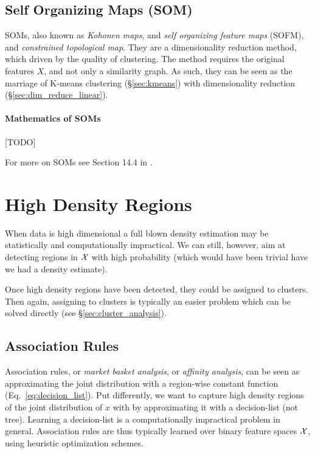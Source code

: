 \subsection{Self Organizing Maps (SOM)}
\label{sec:som}
SOMs, also known as \emph{Kohonen maps}, and \emph{self organizing feature maps} (SOFM), and \emph{constrained topological map}. 
They are a dimensionality reduction method, which driven by the quality of clustering.
The method requires the original features $X$, and not only a similarity graph. 
As such, they can be seen as the marriage of K-means clustering (\S\ref{sec:kmeans}) with dimensionality reduction (\S\ref{sec:dim_reduce_linear}).



\paragraph{Mathematics of SOMs}
[TODO]

For more on SOMs see Section 14.4 in \cite{hastie_elements_2003}. 









\section{High Density Regions}
\label{sec:high_density}

When data is high dimensional a full blown density estimation may be statistically and computationally impractical.
We can still, however, aim at detecting regions in $\mathcal{X}$ with high probability (which would have been trivial have we had a density estimate).

Once high density regions have been detected, they could be assigned to clusters. Then again, assigning to clusters is typically an easier problem which can be solved directly (see \S\ref{sec:cluster_analysis}).



\subsection{Association Rules}
\label{sec:association}
Association rules, or \emph{market basket analysis}, or \emph{affinity analysis}, can be seen as approximating the joint distribution with a region-wise constant function (Eq.~\ref{eq:decision_list}).
Put differently, we want to capture high density regions of the joint distribution of $x$ with by approximating it with a decision-list (not tree).
Learning a decision-list is a computationally impractical problem in general. Association rules are thus typically learned over binary feature spaces $\mathcal{X}$, using heuristic optimization schemes.

